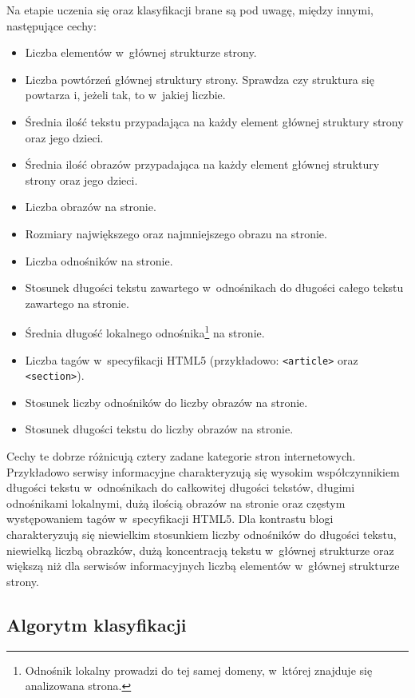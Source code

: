 \documentclass[a4paper,11pt]{article}
\begin{document}
Na etapie uczenia się oraz klasyfikacji brane są pod uwagę, między innymi, następujące cechy:

\begin{itemize}
    \item Liczba elementów w~głównej strukturze strony.
    \item Liczba powtórzeń głównej struktury strony. Sprawdza czy struktura się powtarza i, jeżeli tak, to w~jakiej liczbie.
    \item Średnia ilość tekstu przypadająca na każdy element głównej struktury strony oraz jego dzieci. 
    \item Średnia ilość obrazów przypadająca na każdy element głównej struktury strony oraz jego dzieci.
    \item Liczba obrazów na stronie.
    \item Rozmiary największego oraz najmniejszego obrazu na stronie.
    \item Liczba odnośników na stronie.
    \item Stosunek długości tekstu zawartego w~odnośnikach do długości całego tekstu zawartego na stronie.
    \item Średnia długość lokalnego odnośnika\footnote{Odnośnik lokalny prowadzi do tej samej domeny, w~której znajduje się analizowana strona.} na stronie.
    \item Liczba tagów w~specyfikacji HTML5 (przykładowo: \verb+<article>+ oraz \verb+<section>+).
    \item Stosunek liczby odnośników do liczby obrazów na stronie.
    \item Stosunek długości tekstu do liczby obrazów na stronie.
\end{itemize}

Cechy te dobrze różnicują cztery zadane kategorie stron internetowych. Przykładowo serwisy informacyjne charakteryzują się wysokim współczynnikiem długości tekstu w~odnośnikach do całkowitej długości tekstów, długimi odnośnikami lokalnymi, dużą ilością obrazów na stronie oraz częstym występowaniem tagów w~specyfikacji HTML5. Dla kontrastu blogi charakteryzują się niewielkim stosunkiem liczby odnośników do długości tekstu, niewielką liczbą obrazków, dużą koncentracją tekstu w~głównej strukturze oraz większą niż dla serwisów informacyjnych liczbą elementów w~głównej strukturze strony.

\subsection{Algorytm klasyfikacji}
\end{document}
